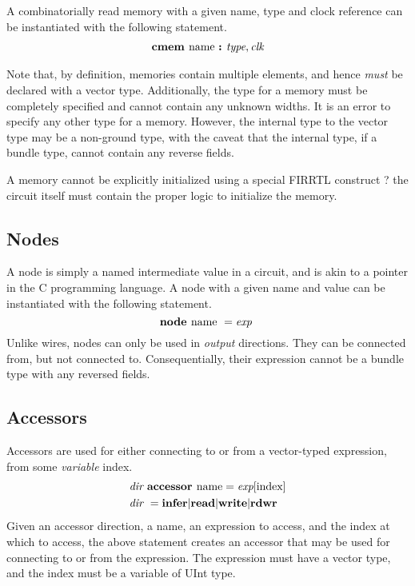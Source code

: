\documentclass[12pt]{article}
\begin{document}
A combinatorially read memory with a given name, type and clock reference can be instantiated with the following statement.
\[
\begin{aligned}
\text{\bf cmem\ } \text{name } \text{\bf :\ } \text{\em type},\text{\em clk} \\
\end{aligned}
\]

Note that, by definition, memories contain multiple elements, and hence {\em must} be declared with a vector type.
Additionally, the type for a memory must be completely specified and cannot contain any unknown widths.
It is an error to specify any other type for a memory.
However, the internal type to the vector type may be a non-ground type, with the caveat that the internal type, if a bundle type, cannot contain any reverse fields.

A memory cannot be explicitly initialized using a special FIRRTL construct ? the circuit itself must contain the proper logic to initialize the memory.

\subsection{Nodes}
A node is simply a named intermediate value in a circuit, and is akin to a pointer in the C programming language.
A node with a given name and value can be instantiated with the following statement.
\[
\text{\bf node\ } \text{name } = \text{\em exp\ } \\
\]
Unlike wires, nodes can only be used in {\em output} directions.
They can be connected from, but not connected to.
Consequentially, their expression cannot be a bundle type with any reversed fields.

\subsection{Accessors}
Accessors are used for either connecting to or from a vector-typed expression, from some {\em variable} index.
\[
\begin{aligned}
&\text{\em dir\ } \text{\bf accessor\ } \text{name} = \text{\em exp}[\text{index}] \\
&\text{\em dir\ }        =     \text{\bf infer} \vert \text{\bf read} \vert \text{\bf write} \vert \text{\bf rdwr\ } \\
\end{aligned}
\]
Given an accessor direction, a name, an expression to access, and the index at which to access, the above statement creates an accessor that may be used for connecting to or from the expression.
The expression must have a vector type, and the index must be a variable of UInt type.
\end{document}

